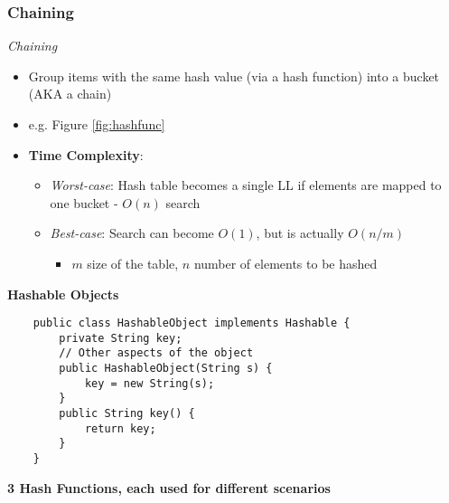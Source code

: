 \documentclass[10pt, 
a4paper, 
oneside, 
headinclude, footinclude, 
BCOR5mm]
{scrartcl}
\begin{document}
\subsubsection{Chaining}
\begin{definition}
    \textit{Chaining}
    \begin{itemize}
        \item Group items with the same hash value (via a hash function) into a bucket (AKA a chain)
        \item e.g. Figure \vref{fig:hashfunc}
        \item \textbf{Time Complexity}:
        \begin{itemize}
            \item \textit{Worst-case}: Hash table becomes a single LL if elements are mapped to one bucket - $O(n)$ search
            \item \textit{Best-case}: Search can become $O(1)$, but is actually $O(n/m)$
            \begin{itemize}
                \item $m$ size of the table, $n$ number of elements to be hashed
            \end{itemize}
        \end{itemize}
    \end{itemize}
\end{definition}
\textbf{Hashable Objects}
\begin{lstlisting}
    public class HashableObject implements Hashable {
        private String key;
        // Other aspects of the object
        public HashableObject(String s) {
            key = new String(s);
        }
        public String key() {
            return key;
        }
    }
\end{lstlisting}
\textbf{3 Hash Functions, each used for different scenarios}
\end{document}
